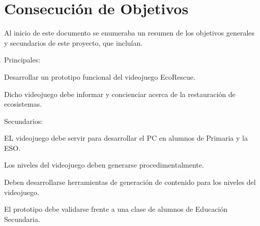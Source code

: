 \section{Consecución de Objetivos}

Al inicio de este documento se enumeraba un resumen de los objetivos generales y secundarios de este proyecto, que incluían.

Principales:
\begin{compactitem}
    \item Desarrollar un prototipo funcional del videojuego EcoRescue.
    \item Dicho videojuego debe informar y concienciar acerca de la restauración de ecosistemas.
\end{compactitem}

Secundarios:
\begin{compactitem}
    \item EL videojuego debe servir para desarrollar el PC en alumnos de Primaria y la ESO. 
    \item Los niveles del videojuego deben generarse procedimentalmente.
    \item Deben desarrollarse herramientas de generación de contenido para los niveles del videojuego.
    \item El prototipo debe validarse frente a una clase de alumnos de Educación Secundaria.  
\end{compactitem}

